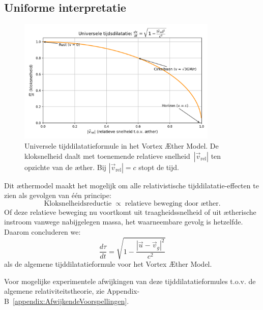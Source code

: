 \subsection*{Uniforme interpretatie}
\begin{figure}[htbp]
    \centering
    \includegraphics[width=0.85\textwidth]{images/11-TijdsvertragingRelatieveBeweging_nl}
    \caption{Universele tijddilatatieformule in het Vortex Æther Model. De kloksnelheid daalt met toenemende relatieve snelheid~$|\vec{v}_{\mathrm{rel}}|$ ten opzichte van de æther. Bij $|\vec{v}_{\mathrm{rel}}| = c$ stopt de tijd.}
    \label{fig:TijdsvertragingRelatieveBeweging}
\end{figure}

Dit æthermodel maakt het mogelijk om alle relativistische tijddilatatie-effecten te zien als gevolgen van één principe:
\[
    \text{Kloksnelheidsreductie} \;\propto\; \text{relatieve beweging door æther}.
\]
Of deze relatieve beweging nu voortkomt uit traagheidssnelheid of uit ætherische instroom vanwege nabijgelegen massa, het waarneembare gevolg is hetzelfde. Daarom concluderen we:
\[
    \boxed{\frac{d\tau}{dt} = \sqrt{1 - \frac{|\vec{u} - \vec{v}_g|^2}{c^2}}}
\]
als de algemene tijddilatatieformule voor het Vortex Æther Model.

Voor mogelijke experimentele afwijkingen van deze tijddilatatieformules t.o.v. de algemene relativiteitstheorie, zie Appendix-B~\ref{appendix:AfwijkendeVoorspellingen}.